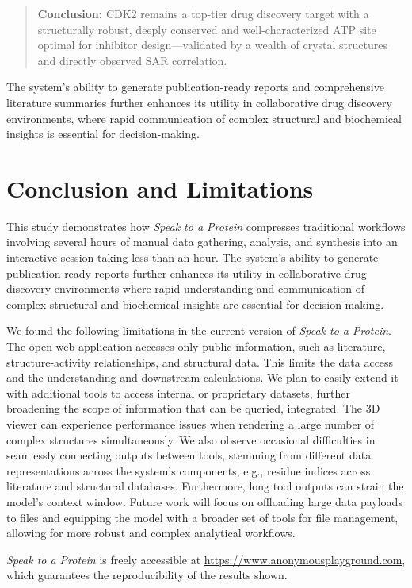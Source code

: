 \documentclass{article}
\begin{document}
\begin{quote}
\textbf{Conclusion:} CDK2 remains a top-tier drug discovery target with a structurally robust, deeply conserved and well-characterized ATP site optimal for inhibitor design—validated by a wealth of crystal structures and directly observed SAR correlation.
\end{quote}

The system's ability to generate publication-ready reports and comprehensive literature summaries further enhances its utility in collaborative drug discovery environments, where rapid communication of complex structural and biochemical insights is essential for decision-making.

\section{Conclusion and Limitations}\label{sec:discussion}

This study demonstrates how \emph{Speak to a Protein} compresses traditional workflows involving several hours of manual data gathering, analysis, and synthesis into an interactive session taking less than an hour. The system's ability to generate publication-ready reports further enhances its utility in collaborative drug discovery environments where rapid understanding and communication of complex structural and biochemical insights are essential for decision-making.

We found the following limitations in the current version of \emph{Speak to a Protein}. The open web application accesses only public information, such as literature, structure-activity relationships, and structural data. This limits the data access and the understanding and downstream calculations. We plan to easily extend it with additional tools to access internal or proprietary datasets, further broadening the scope of information that can be queried, integrated.
 The 3D viewer can experience performance issues when rendering a large number of complex structures simultaneously. We also observe occasional difficulties in seamlessly connecting outputs between tools, stemming from different data representations across the system's components, e.g., residue indices across literature and structural databases. Furthermore, long tool outputs can strain the model's context window. Future work will focus on offloading large data payloads to files and equipping the model with a broader set of tools for file management, allowing for more robust and complex analytical workflows.

\emph{Speak to a Protein} is freely accessible at \url{https://www.anonymousplayground.com}, which guarantees the reproducibility of the results shown. 
\end{document}
